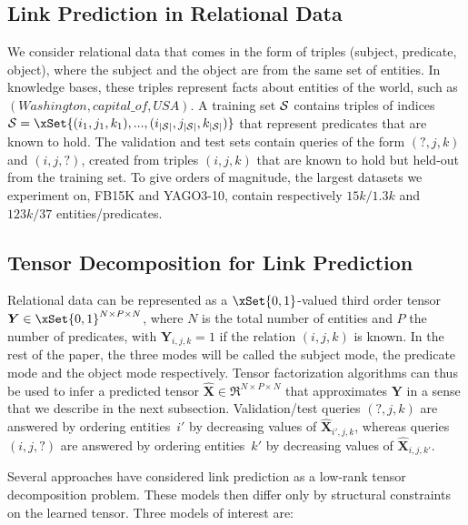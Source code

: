 \documentclass{article}
\newcommand{\tensor}[1]{{\bm #1}}
\newcommand{\fb}{{FB15K}\xspace}
\newcommand{\yago}{{YAGO3-10}\xspace}
\newcommand{\tens}[1]{\tensor{#1}}
\newcommand{\tensi}[2]{\tensor{#1}_{#2}}
\newcommand{\nents}{N}
\newcommand{\nrels}{P}
\newcommand{\unkn}{X}
\newcommand{\pred}{\hat{\unkn}}
\newcommand{\tgt}{Y}
\newcommand{\indices}{{\cal S}}
\newcommand{\indecesz}{{|\indices|}}
\begin{document}
\subsection{Link Prediction in Relational Data}
We consider relational data that comes in the form of triples (subject, predicate, object), where the subject and the object are from the same set of entities. In knowledge bases, these triples represent facts about entities of the world, such as $(W\!ashington, capital\_of, U\!S\!A)$. A training set $\indices$ contains triples of indices $\indices = \xSet{(i_1, j_1, k_1), ..., (i_\indecesz, j_\indecesz, k_\indecesz)}$ that represent predicates that are known to hold. The validation and test sets contain queries of the form $(?, j, k)$ and $(i, j, ?)$, created from triples $(i,j,k)$ that are known to hold but held-out from the training set. To give orders of magnitude, the largest datasets we experiment on, \fb and \yago, contain respectively $15k/1.3k$ and $123k/37$ entities/predicates.

\subsection{Tensor Decomposition for Link Prediction}

Relational data can be represented as a $\xSet{0,1}$-valued third order tensor $\tens{\tgt} \in \xSet{0,1}^{\nents\times\nrels\times\nents}$, where $\nents$ is the total number of entities and $\nrels$ the number of predicates, with $\tensi{\tgt}{i,j,k} = 1$ if the relation $(i,j,k)$ is known. In the rest of the paper, the three modes will be called the subject mode, the predicate mode and the object mode respectively. Tensor factorization algorithms can thus be used to infer a predicted tensor $\tens{\pred}\in\Re^{\nents\times\nrels\times\nents}$ that approximates $\tens{\tgt}$ in a sense that we describe in the next subsection. Validation/test queries $(?, j, k)$ are answered by ordering entities~$i'$ by decreasing values of $\tensi{\pred}{i',j,k}$, whereas queries $(i,j,?)$ are answered by ordering entities~$k'$ by decreasing values of $\tensi{\pred}{i,j,k'}$.

Several approaches have considered link prediction as a low-rank tensor decomposition problem. These models then differ only by structural constraints on the learned tensor. Three models of interest are:
\end{document}
